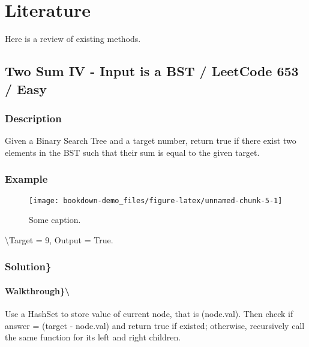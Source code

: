 \documentclass[]{book}
\begin{document}
\hypertarget{literature}{%
\chapter{Literature}\label{literature}}

Here is a review of existing methods.

\hypertarget{two-sum-iv---input-is-a-bst-leetcode-653-easy-1}{%
\section{Two Sum IV - Input is a BST / LeetCode 653 / Easy}\label{two-sum-iv---input-is-a-bst-leetcode-653-easy-1}}

\hypertarget{description-39}{%
\subsection{Description}\label{description-39}}

Given a Binary Search Tree and a target number, return true if there exist two elements in the BST such that their sum
is equal to the given target.

\hypertarget{example-38}{%
\subsection{Example}\label{example-38}}

\begin{figure}
\texttt{[image: bookdown-demo\_files/figure-latex/unnamed-chunk-5-1]} \caption{Some caption.}\label{fig:unnamed-chunk-5}
\end{figure}

\textbackslash{}Target = 9, Output = True.

\hypertarget{solution-31}{%
\subsection{Solution\}}\label{solution-31}}

\hypertarget{walkthrough-40}{%
\subsubsection{Walkthrough\}\textbackslash{}}\label{walkthrough-40}}

Use a HashSet to store value of current node, that is (node.val). Then check if answer = (target - node.val)
and return true if existed; otherwise, recursively call the same function for its left and right children.
\end{document}
